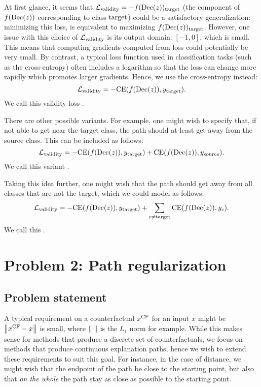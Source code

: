 \documentclass[../main.tex]{subfiles}
\begin{document}
At first glance, it seems that $\mathcal{L}_\text{validity} = -f(\operatorname{Dec}(z))_{\mathrm{target}}$ (the component of $f(\operatorname{Dec}(z))$ corresponding to class $\mathrm{target}$) could be a satisfactory generalization: minimizing this loss, is equivalent to maximizing $f(\operatorname{Dec}(z))_{\mathrm{target}}$.
However, one issue with this choice of $\mathcal{L}_\text{validity}$ is its output domain: $[-1, 0]$, which is small. This means that computing gradients computed from loss could potentially be very small. By contrast, a typical loss function used in classification tasks (such as the cross-entropy) often includes a logarithm so that the loss can change more rapidly which promotes larger gradients. \citenote{}
Hence, we use the cross-entropy instead: $$\mathcal{L}_\text{validity} = -\text{CE}(f(\operatorname{Dec}(z)), y_{\mathrm{target}}).$$
We call this validity loss .

There are other possible variants. For example, one might wish to specify that, if not able to get near the target class, the path should at least get away from the source class. This can be included as follows:
$$\mathcal{L}_\text{validity} = -\text{CE}(f(\operatorname{Dec}(z)), y_{\mathrm{target}}) + \text{CE}(f(\operatorname{Dec}(z)), y_{\mathrm{source}}).$$
We call this variant .

Taking this idea further, one might wish that the path should get away from all classes that are not the target, which we could model as follows:
$$\mathcal{L}_\text{validity} = -\text{CE}(f(\operatorname{Dec}(z)), y_{\mathrm{target}}) + \sum_{c \neq \mathrm{target}} \text{CE}(f(\operatorname{Dec}(z)), y_c).$$
We call this . 


\section{Problem 2: Path regularization}

\subsection{Problem statement}

A typical requirement on a counterfactual $x^\text{CF}$ for an input $x$ might be $\left\lVert x^\text{CF} - x\right\rVert$ is small, where $\left\lVert\cdot\right\rVert$ is the $L_1$ norm for example.
While this makes sense for methods that produce a discrete set of counterfactuals, we focus on methods that produce continuous explanation paths, hence we wish to extend these requirements to suit this goal.
For instance, in the case of distance, we might wish that the endpoint of the path be close to the starting point, but also that \emph{on the whole} the path stay as close as possible to the starting point.
\end{document}
